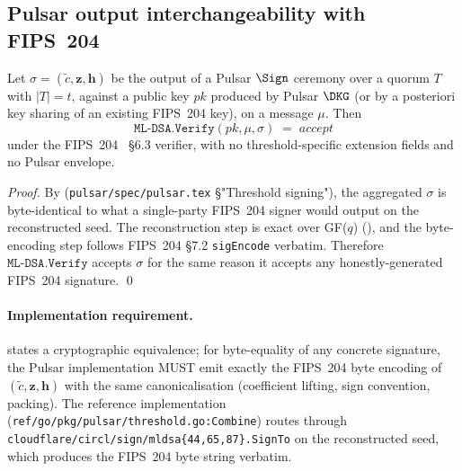 
\subsection*{Pulsar output interchangeability with FIPS~204}

\begin{theorem}
\label{thm:pulsar-output-interchange}
Let $\sigma = (\tilde c, \mathbf{z}, \mathbf{h})$ be the output of a
Pulsar $\Sign$ ceremony over a quorum $T$ with $|T| = t$, against a
public key $\mathit{pk}$ produced by Pulsar $\DKG$ (or by a
posteriori key sharing of an existing FIPS~204 key), on a message
$\mu$. Then
\[
  \mathtt{ML\text{-}DSA.Verify}(\mathit{pk}, \mu, \sigma) \;=\; \mathit{accept}
\]
under the FIPS~204~\cite{nist-fips204} \S6.3 verifier, with no
threshold-specific extension fields and no Pulsar envelope.
\end{theorem}

\begin{proof}
By  (\texttt{pulsar/spec/pulsar.tex}
\S "Threshold signing"), the aggregated $\sigma$ is byte-identical
to what a single-party FIPS~204 signer would output on the
reconstructed seed. The reconstruction step is exact over GF($q$)
(), and the byte-encoding step
follows FIPS~204 \S7.2 \texttt{sigEncode} verbatim. Therefore
$\mathtt{ML\text{-}DSA.Verify}$ accepts $\sigma$ for the same reason
it accepts any honestly-generated FIPS~204 signature. \qed
\end{proof}

\paragraph{Implementation requirement.}
 states a cryptographic
equivalence; for byte-equality of any concrete signature, the
Pulsar implementation MUST emit exactly the FIPS~204 byte
encoding of $(\tilde c, \mathbf{z}, \mathbf{h})$ with the same
canonicalisation (coefficient lifting, sign convention, packing).
The reference implementation
(\texttt{ref/go/pkg/pulsar/threshold.go:Combine}) routes through
\texttt{cloudflare/circl/sign/mldsa\{44,65,87\}.SignTo} on the
reconstructed seed, which produces the FIPS~204 byte string verbatim.

